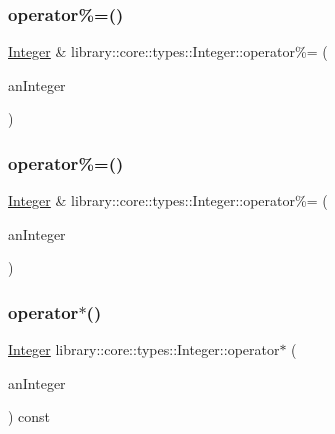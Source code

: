 \subsubsection{\texorpdfstring{operator\%=()}{operator\%=()}\hspace{0.1cm}{\footnotesize\ttfamily [1/2]}}
{\footnotesize\ttfamily \hyperlink{classlibrary_1_1core_1_1types_1_1Integer}{Integer} \& library\+::core\+::types\+::\+Integer\+::operator\%= (\begin{DoxyParamCaption}\item[{const \hyperlink{classlibrary_1_1core_1_1types_1_1Integer}{Integer} \&}]{an\+Integer }\end{DoxyParamCaption})}

\mbox{\label{classlibrary_1_1core_1_1types_1_1Integer_a88482e4677001d7d523f90ef28ac95f6}} 
\subsubsection{\texorpdfstring{operator\%=()}{operator\%=()}\hspace{0.1cm}{\footnotesize\ttfamily [2/2]}}
{\footnotesize\ttfamily \hyperlink{classlibrary_1_1core_1_1types_1_1Integer}{Integer} \& library\+::core\+::types\+::\+Integer\+::operator\%= (\begin{DoxyParamCaption}\item[{const \hyperlink{classlibrary_1_1core_1_1types_1_1Integer_a623afb1580f870fd8a1997b1c12c917d}{Integer\+::\+Value\+Type} \&}]{an\+Integer }\end{DoxyParamCaption})}

\mbox{\label{classlibrary_1_1core_1_1types_1_1Integer_a68d6d1c6e178a5a6760345754eb84ad4}} 
\subsubsection{\texorpdfstring{operator$\ast$()}{operator*()}\hspace{0.1cm}{\footnotesize\ttfamily [1/2]}}
{\footnotesize\ttfamily \hyperlink{classlibrary_1_1core_1_1types_1_1Integer}{Integer} library\+::core\+::types\+::\+Integer\+::operator$\ast$ (\begin{DoxyParamCaption}\item[{const \hyperlink{classlibrary_1_1core_1_1types_1_1Integer}{Integer} \&}]{an\+Integer }\end{DoxyParamCaption}) const}

